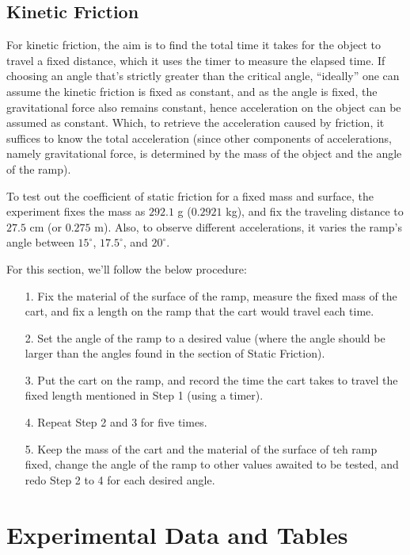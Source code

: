 \documentclass{article}
\begin{document}
\hfil

\subsection{Kinetic Friction}
For kinetic friction, the aim is to find the total time it takes for the object to travel a fixed distance, which it uses the timer to measure the elapsed time. If choosing an angle that's strictly greater than the critical angle, ``ideally'' one can assume the kinetic friction is fixed as constant, and as the angle is fixed, the gravitational force also remains constant, hence acceleration on the object can be assumed as constant. Which, to retrieve the acceleration caused by friction, it suffices to know the total acceleration (since other components of accelerations, namely gravitational force, is determined by the mass of the object and the angle of the ramp). 

To test out the coefficient of static friction for a fixed mass and surface, the experiment fixes the mass as $292.1$ g ($0.2921$ kg), and fix the traveling distance to $27.5$ cm (or $0.275$ m). Also, to observe different accelerations, it varies the ramp's angle between $15^\circ$, $17.5^\circ$, and $20^\circ$.

\hfil

For this section, we'll follow the below procedure:
\begin{itemize}
    \item[1.] Fix the material of the surface of the ramp, measure the fixed mass of the cart, and fix a length on the ramp that the cart would travel each time.
    \item[2.] Set the angle of the ramp to a desired value (where the angle should be larger than the angles found in the section of Static Friction).
    \item[3.] Put the cart on the ramp, and record the time the cart takes to travel the fixed length mentioned in Step 1 (using a timer).
    \item[4.] Repeat Step 2 and 3 for five times.
    \item[5.] Keep the mass of the cart and the material of the surface of teh ramp fixed, change the angle of the ramp to other values awaited to be tested, and redo Step 2 to 4 for each desired angle. 
\end{itemize}

\pagebreak

\section{Experimental Data and Tables}
\end{document}
